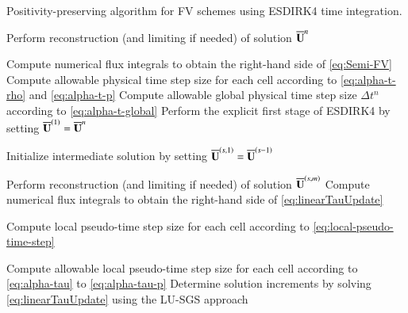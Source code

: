  \begin{algorithm}[htbp!]
        \renewcommand{\baselinestretch}{1.3}\selectfont
 	\caption{Positivity-preserving algorithm for FV schemes using ESDIRK4 time integration.}  
 	\label{alg:pp-algorithm}
 	\begin{algorithmic}[1] 
        
        \State Perform reconstruction (and limiting if needed) of solution $\overline{\mathbf{U}}^{n}$ %
                
        \State Compute numerical flux integrals to obtain the right-hand side of \eqref{eq:Semi-FV} %
        \State Compute allowable physical time step size for each cell according to \eqref{eq:alpha-t-rho} and \eqref{eq:alpha-t-p}
        \State Compute allowable global physical time step size $\Delta t^n$ according to \eqref{eq:alpha-t-global}
        \State Perform the explicit first stage of ESDIRK4 by setting $\overline{\mathbf{U}}^{\left(1\right)} =\overline{\mathbf{U}}^{n}$ %

        \State Initialize intermediate solution by setting $\overline{\mathbf{U}}^{\left(s,1\right)}=\overline{\mathbf{U}}^{\left(s-1\right)}$ 
        

        \State Perform reconstruction (and limiting if needed) of solution $\overline{\mathbf{U}}^{\left(s,m\right)}$ %
        \State Compute numerical flux integrals to obtain the right-hand side of \eqref{eq:linearTauUpdate} %
        
        \State Compute local pseudo-time step size for each cell according to \eqref{eq:local-pseudo-time-step}

        \State Compute allowable local pseudo-time step size for each cell according to \eqref{eq:alpha-tau} to \eqref{eq:alpha-tau-p}
        \State Determine solution increments by solving \eqref{eq:linearTauUpdate} using the LU-SGS approach  %


\end{algorithmic}
\end{algorithm}
